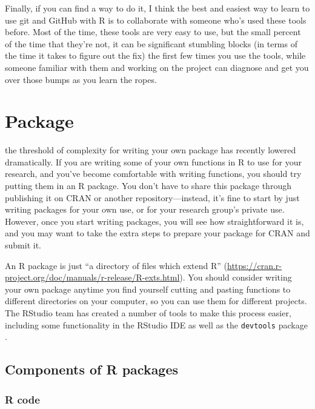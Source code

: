 \documentclass[]{tufte-book}
\begin{document}
Finally, if you can find a way to do it, I think the best and easiest way to learn to use git
and GitHub with R is to collaborate with someone who's used these tools before. Most of the
time, these tools are very easy to use, but the small percent of the time that they're not,
it can be significant stumbling blocks (in terms of the time it takes to figure out the fix)
the first few times you use the tools, while someone familiar with them and working on the
project can diagnose and get you over those bumps as you learn the ropes.

\hypertarget{package}{%
\chapter{Package}\label{package}}

 the threshold of complexity
for writing your own package has recently lowered dramatically. If you are writing
some of your own functions in R to use for your research, and you've become comfortable
with writing functions, you should try putting them in an R package. You don't have
to share this package through publishing it on CRAN or another repository---instead, it's
fine to start by just writing packages for your own use, or for your research group's
private use. However, once you start writing packages, you will see how straightforward
it is, and you may want to take the extra steps to prepare your package for CRAN and
submit it.

An R package is just ``a directory of files which extend R'' (\url{https://cran.r-project.org/doc/manuals/r-release/R-exts.html}).
You should consider writing your own package anytime you find yourself cutting and pasting
functions to different directories on your computer, so you can use them for different
projects. The RStudio team has created a number of tools to make this process easier, including
some functionality in the RStudio IDE as well as the \texttt{devtools} package \citep{R-devtools}.

\hypertarget{components-of-r-packages}{%
\section{Components of R packages}\label{components-of-r-packages}}

\hypertarget{r-code}{%
\subsection{R code}\label{r-code}}
\end{document}
